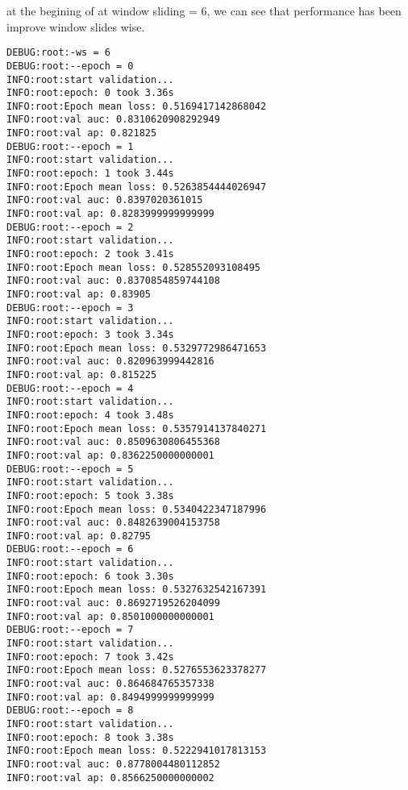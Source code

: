\documentclass[11pt]{article}
\begin{document}
at the begining of at window sliding = 6, we  can see that performance has been improve window slides wise.
\begin{verbatim}
DEBUG:root:-ws = 6
DEBUG:root:--epoch = 0
INFO:root:start validation...
INFO:root:epoch: 0 took 3.36s
INFO:root:Epoch mean loss: 0.5169417142868042
INFO:root:val auc: 0.8310620908292949
INFO:root:val ap: 0.821825
DEBUG:root:--epoch = 1
INFO:root:start validation...
INFO:root:epoch: 1 took 3.44s
INFO:root:Epoch mean loss: 0.5263854444026947
INFO:root:val auc: 0.8397020361015
INFO:root:val ap: 0.8283999999999999
DEBUG:root:--epoch = 2
INFO:root:start validation...
INFO:root:epoch: 2 took 3.41s
INFO:root:Epoch mean loss: 0.528552093108495
INFO:root:val auc: 0.8370854859744108
INFO:root:val ap: 0.83905
DEBUG:root:--epoch = 3
INFO:root:start validation...
INFO:root:epoch: 3 took 3.34s
INFO:root:Epoch mean loss: 0.5329772986471653
INFO:root:val auc: 0.820963999442816
INFO:root:val ap: 0.815225
DEBUG:root:--epoch = 4
INFO:root:start validation...
INFO:root:epoch: 4 took 3.48s
INFO:root:Epoch mean loss: 0.5357914137840271
INFO:root:val auc: 0.8509630806455368
INFO:root:val ap: 0.8362250000000001
DEBUG:root:--epoch = 5
INFO:root:start validation...
INFO:root:epoch: 5 took 3.38s
INFO:root:Epoch mean loss: 0.5340422347187996
INFO:root:val auc: 0.8482639004153758
INFO:root:val ap: 0.82795
DEBUG:root:--epoch = 6
INFO:root:start validation...
INFO:root:epoch: 6 took 3.30s
INFO:root:Epoch mean loss: 0.5327632542167391
INFO:root:val auc: 0.8692719526204099
INFO:root:val ap: 0.8501000000000001
DEBUG:root:--epoch = 7
INFO:root:start validation...
INFO:root:epoch: 7 took 3.42s
INFO:root:Epoch mean loss: 0.5276553623378277
INFO:root:val auc: 0.864684765357338
INFO:root:val ap: 0.8494999999999999
DEBUG:root:--epoch = 8
INFO:root:start validation...
INFO:root:epoch: 8 took 3.38s
INFO:root:Epoch mean loss: 0.5222941017813153
INFO:root:val auc: 0.8778004480112852
INFO:root:val ap: 0.8566250000000002
\end{verbatim}
\end{document}

